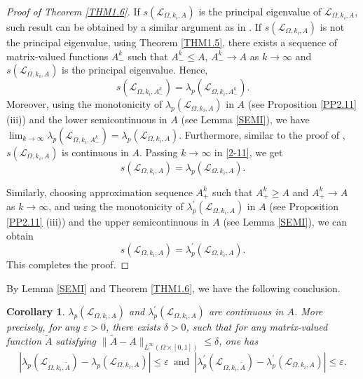 \documentclass[11pt,reqno]{amsart}
\newtheorem{corollary}[theorem]{Corollary}
\numberwithin{equation}{section}
\begin{document}
%
%
\begin{proof}[Proof of Theorem \ref{THM1.6}]
If $s(\mathcal{L}_{\Omega,k_{i},A})$ is the principal eigenvalue of $\mathcal{L}_{\Omega,k_{i},A}$, such result can be obtained by a similar argument as in \cite[Proposition 3.5]{Feng}.
If $s(\mathcal{L}_{\Omega,k_{i},A})$ is not the principal eigenvalue,
using Theorem \ref{THM1.5}, there exists a sequence of matrix-valued functions $A^{k}_{-}$ such that $A^{k}_{-} \leq A$, $A^{k}_{-} \to A$ as $k\to\infty$ and $s(\mathcal{L}_{\Omega,k_{i},A})$ is the principal eigenvalue. Hence,
\begin{equation}\label{2-11}
s(\mathcal{L}_{\Omega,k_{i},A^{k}_{-}})
=\lambda_{p}(\mathcal{L}_{\Omega,k_{i},A^{k}_{-}}).
\end{equation}
Moreover, using the monotonicity of $\lambda_{p}(\mathcal{L}_{\Omega,k_{i},A})$ in $A$ (see Proposition \ref{PP2.11} (iii)) and the lower semicontinuous in $A$ (see Lemma \ref{SEMI}), we have $\lim_{k\to\infty} \lambda_{p}(\mathcal{L}_{\Omega,k_{i},A^{k}_{-}}) = \lambda_{p}(\mathcal{L}_{\Omega,k_{i},A})$.
Furthermore, similar to the proof of \cite[Theorem A.1]{ZL2}, $s(\mathcal{L}_{\Omega,k_{i},A})$ is continuous in $A$. Passing $k\to\infty$ in \eqref{2-11}, we get
\begin{equation*}
s(\mathcal{L}_{\Omega,k_{i},A})
=\lambda_{p}(\mathcal{L}_{\Omega,k_{i},A}).
\end{equation*}

Similarly, choosing approximation sequence $A_{+}^{k}$ such that $A^{k}_{+}\geq A$ and $A^{k}_{+} \to A$ as $k\to\infty$, and using the monotonicity of $\lambda_{p}^{\prime}(\mathcal{L}_{\Omega,k_{i},A})$ in $A$ (see Proposition \ref{PP2.11} (iii)) and the upper semicontinuous in $A$ (see Lemma \ref{SEMI}), we can obtain
\begin{equation*}
s(\mathcal{L}_{\Omega,k_{i},A})
=\lambda_{p}^{\prime}(\mathcal{L}_{\Omega,k_{i},A}).
\end{equation*}
This completes the proof.
\end{proof}

By Lemma \ref{SEMI} and Theorem \ref{THM1.6}, we have the following conclusion.
\begin{corollary}
$\lambda_{p}(\mathcal{L}_{\Omega, k_{i}, A})$ and $\lambda_{p}^{\prime}(\mathcal{L}_{\Omega, k_{i}, A})$ are continuous in $A$.
More precisely, for any $\varepsilon>0$, there exists $\delta>0$, such that for any matrix-valued
function $\tilde{A}$ satisfying $\| \tilde{A}-A\|_{L^{\infty}(\Omega\times[0,1])}\le \delta$, one has
\begin{equation*}
| \lambda_{p}(\mathcal{L}_{\Omega,k_i,\tilde{A} }) - \lambda_{p}(\mathcal{L}_{\Omega,k_i,A})|
\leq
\varepsilon
\enspace \text{and} \enspace
|\lambda_{p}^{\prime}(\mathcal{L}_{\Omega,k_i,\tilde{A} })
-
\lambda_{p}^{\prime}(\mathcal{L}_{\Omega,k_i,A})|
\leq
\varepsilon.
\end{equation*}
\end{corollary}
\end{document}
